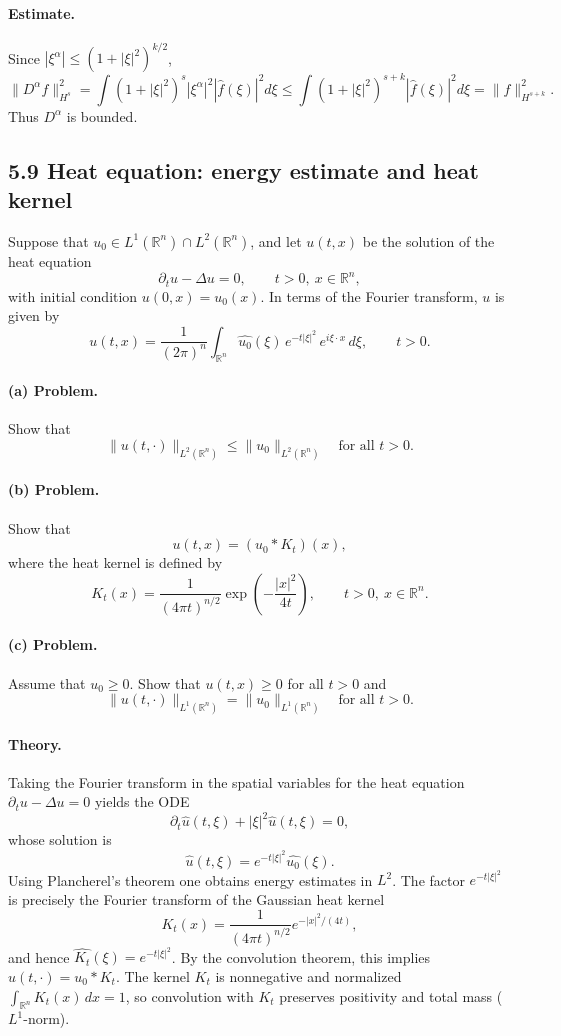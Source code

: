 \documentclass[12pt,a4paper]{article}
\theoremstyle{plain}
\theoremstyle{definition}
\theoremstyle{remark}
\theoremstyle{remark}
\begin{document}
\paragraph{\textbf{Estimate.}}
Since $|\xi^\alpha| \le (1+|\xi|^2)^{k/2}$,
\[
\|D^\alpha f\|_{H^{s}}^2
= \int (1+|\xi|^2)^s |\xi^\alpha|^2 |\widehat{f}(\xi)|^2 d\xi
\le \int (1+|\xi|^2)^{s+k} |\widehat{f}(\xi)|^2 d\xi
= \|f\|_{H^{s+k}}^2.
\]
Thus $D^\alpha$ is bounded.


\subsection*{5.9 \quad Heat equation: energy estimate and heat kernel}

Suppose that \(u_0 \in L^1(\mathbb{R}^n) \cap L^2(\mathbb{R}^n)\), and let
\(u(t,x)\) be the solution of the heat equation
\[
\partial_t u - \Delta u = 0,
\qquad t>0,\ x\in\mathbb{R}^n,
\]
with initial condition \(u(0,x) = u_0(x)\).
In terms of the Fourier transform, \(u\) is given by
\[
u(t,x)
= \frac{1}{(2\pi)^n} \int_{\mathbb{R}^n}
\widehat{u_0}(\xi)\,e^{-t|\xi|^2}\,e^{i\xi\cdot x}\,d\xi,
\qquad t>0.
\]

\paragraph{\textbf{(a) Problem.}}
Show that
\[
\|u(t,\cdot)\|_{L^2(\mathbb{R}^n)}
\le \|u_0\|_{L^2(\mathbb{R}^n)}
\quad\text{for all } t>0.
\]

\paragraph{\textbf{(b) Problem.}}
Show that
\[
u(t,x) = (u_0 * K_t)(x),
\]
where the heat kernel is defined by
\[
K_t(x)
= \frac{1}{(4\pi t)^{n/2}} \exp\!\left(-\frac{|x|^2}{4t}\right),
\qquad t>0,\ x\in\mathbb{R}^n.
\]

\paragraph{\textbf{(c) Problem.}}
Assume that \(u_0 \ge 0\).
Show that \(u(t,x) \ge 0\) for all \(t>0\) and
\[
\|u(t,\cdot)\|_{L^1(\mathbb{R}^n)}
= \|u_0\|_{L^1(\mathbb{R}^n)}
\quad\text{for all } t>0.
\]

\bigskip
\paragraph{\textbf{Theory.}}
Taking the Fourier transform in the spatial variables for the heat equation
\(\partial_t u - \Delta u = 0\) yields the ODE
\[
\partial_t \widehat{u}(t,\xi) + |\xi|^2 \widehat{u}(t,\xi) = 0,
\]
whose solution is
\[
\widehat{u}(t,\xi)
= e^{-t|\xi|^2} \widehat{u_0}(\xi).
\]
Using Plancherel's theorem one obtains energy estimates in \(L^2\). The factor
\(e^{-t|\xi|^2}\) is precisely the Fourier transform of the Gaussian heat kernel
\[
K_t(x)
= \frac{1}{(4\pi t)^{n/2}} e^{-|x|^2/(4t)},
\]
and hence
\(\widehat{K_t}(\xi) = e^{-t|\xi|^2}\).
By the convolution theorem, this implies
\(u(t,\cdot) = u_0 * K_t\).
The kernel \(K_t\) is nonnegative and normalized
\(\int_{\mathbb{R}^n} K_t(x)\,dx = 1\),
so convolution with \(K_t\) preserves positivity and total mass
(\(L^1\)-norm).
\end{document}
